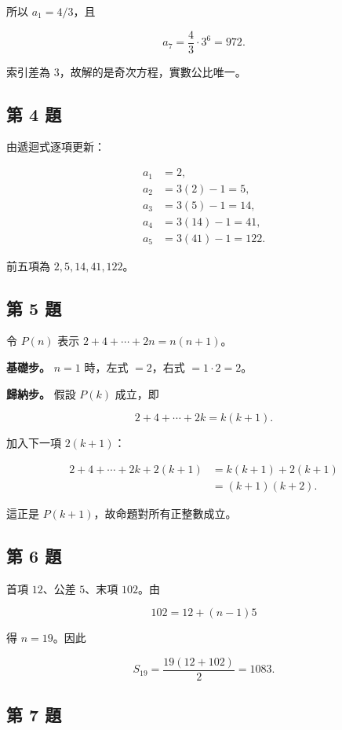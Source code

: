 \documentclass[11pt,a4paper]{article}
\begin{document}
所以 \(a_1=4/3\)，且

\[
a_7=\frac43\cdot3^6=972.
\]

索引差為 3，故解的是奇次方程，實數公比唯一。

\subsection{第 4 題}\label{ux7b2c-4-ux984c}

由遞迴式逐項更新：

\[
\begin{aligned}
a_1&=2,\\
a_2&=3(2)-1=5,\\
a_3&=3(5)-1=14,\\
a_4&=3(14)-1=41,\\
a_5&=3(41)-1=122.
\end{aligned}
\]

前五項為 \(2,5,14,41,122\)。

\subsection{第 5 題}\label{ux7b2c-5-ux984c}

令 \(P(n)\) 表示 \(2+4+\cdots+2n=n(n+1)\)。

\textbf{基礎步。} \(n=1\) 時，左式 \(=2\)，右式 \(=1\cdot2=2\)。

\textbf{歸納步。} 假設 \(P(k)\) 成立，即

\[
2+4+\cdots+2k=k(k+1).
\]

加入下一項 \(2(k+1)\)：

\[
\begin{aligned}
2+4+\cdots+2k+2(k+1)
&=k(k+1)+2(k+1)\\
&=(k+1)(k+2).
\end{aligned}
\]

這正是 \(P(k+1)\)，故命題對所有正整數成立。

\subsection{第 6 題}\label{ux7b2c-6-ux984c}

首項 \(12\)、公差 \(5\)、末項 \(102\)。由

\[
102=12+(n-1)5
\]

得 \(n=19\)。因此

\[
S_{19}=\frac{19(12+102)}2=1083.
\]

\subsection{第 7 題}\label{ux7b2c-7-ux984c}
\end{document}

